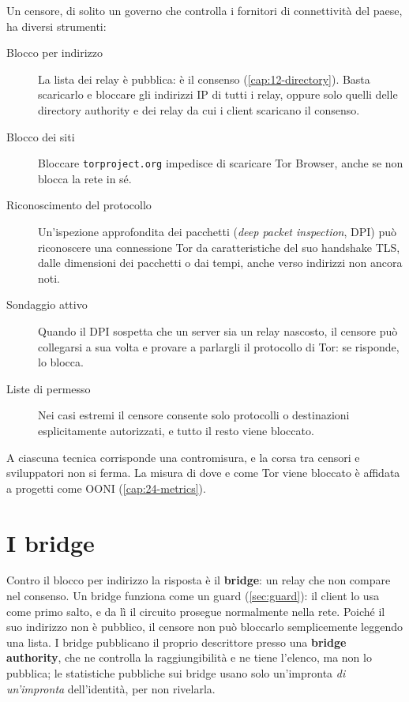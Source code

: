 Un censore, di solito un governo che controlla i fornitori di connettività del paese, ha diversi strumenti:
\begin{description}
  \item[Blocco per indirizzo] La lista dei relay è pubblica: è il consenso (\cref{cap:12-directory}). Basta scaricarlo e bloccare gli indirizzi IP di tutti i relay, oppure solo quelli delle directory authority e dei relay da cui i client scaricano il consenso.
  \item[Blocco dei siti] Bloccare \texttt{torproject.org} impedisce di scaricare Tor Browser, anche se non blocca la rete in sé.
  \item[Riconoscimento del protocollo] Un'ispezione approfondita dei pacchetti (\emph{deep packet inspection}, DPI) può riconoscere una connessione Tor da caratteristiche del suo handshake TLS, dalle dimensioni dei pacchetti o dai tempi, anche verso indirizzi non ancora noti.
  \item[Sondaggio attivo] Quando il DPI sospetta che un server sia un relay nascosto, il censore può collegarsi a sua volta e provare a parlargli il protocollo di Tor: se risponde, lo blocca.
  \item[Liste di permesso] Nei casi estremi il censore consente solo protocolli o destinazioni esplicitamente autorizzati, e tutto il resto viene bloccato.
\end{description}
A ciascuna tecnica corrisponde una contromisura, e la corsa tra censori e sviluppatori non si ferma. La misura di dove e come Tor viene bloccato è affidata a progetti come OONI (\cref{cap:24-metrics}).

\section{I bridge}\label{sec:cens-bridge}

Contro il blocco per indirizzo la risposta è il \textbf{bridge}: un relay che non compare nel consenso. Un bridge funziona come un guard (\cref{sec:guard}): il client lo usa come primo salto, e da lì il circuito prosegue normalmente nella rete. Poiché il suo indirizzo non è pubblico, il censore non può bloccarlo semplicemente leggendo una lista. I bridge pubblicano il proprio descrittore presso una \textbf{bridge authority}, che ne controlla la raggiungibilità e ne tiene l'elenco, ma non lo pubblica; le statistiche pubbliche sui bridge usano solo un'impronta \emph{di un'impronta} dell'identità, per non rivelarla.

